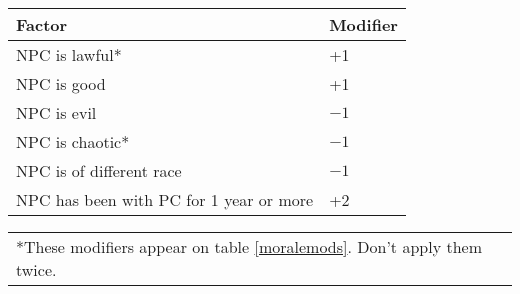 \begin{multicols}{2}
\begin{minipage}{\columnwidth}
\end{minipage}

\noindent
\begin{minipage}{\columnwidth}

\label{permanentmoralemodifiers}
\noindent
\begin{tabular}{|p{}|p{}|}
\hline
Factor	& Modifier \\
\hline\hline
\rowcolor[gray]{.9}NPC is lawful*	& +1 \\
NPC is good	& +1 \\
\rowcolor[gray]{.9}NPC is evil	& $-1$ \\
NPC is chaotic*	& $-1$ \\
\rowcolor[gray]{.9}NPC is of different race	& $-1$ \\
NPC has been with PC for 1 year or more	& +2 \\
\hline
\end{tabular}
\noindent\begin{tabular}{p{}}
*These modifiers appear on table \ref{moralemods}.  Don't apply them twice. \\
\end{tabular}\vspace{.5em}

\end{minipage}

\end{multicols}



